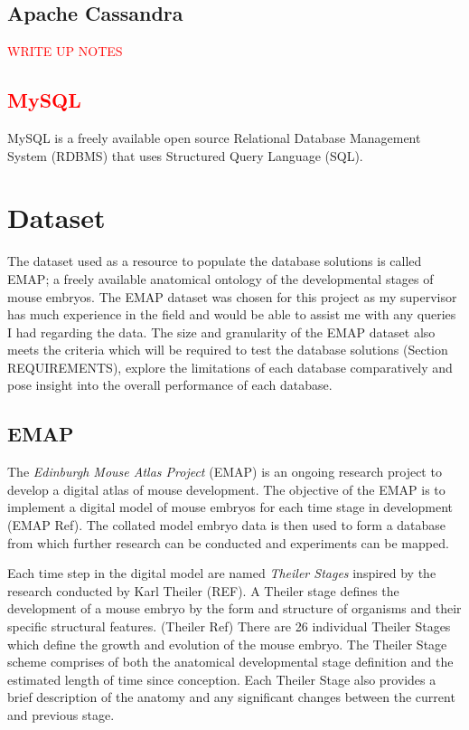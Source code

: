 \subsection{Apache Cassandra}\label{cassandra}
\textcolor{red}{WRITE UP NOTES}

\textcolor{red}{\subsection{MySQL}\label{mysql}}
MySQL is a freely available open source Relational Database Management System (RDBMS) that uses Structured Query Language (SQL).

\section{Dataset}
The dataset used as a resource to populate the database solutions is called EMAP; a freely available anatomical ontology of the developmental stages of mouse embryos. The EMAP dataset was chosen for this project as my supervisor has much experience in the field and would be able to assist me with any queries I had regarding the data. The size and granularity of the EMAP dataset also meets the criteria which will be required to test the database solutions (Section REQUIREMENTS), explore the limitations of each database comparatively and pose insight into the overall performance of each database.

\subsection{EMAP}
The \textit{Edinburgh Mouse Atlas Project} (EMAP) is an ongoing research project to develop a digital atlas of mouse development. The objective of the EMAP is to implement a digital model of mouse embryos for each time stage in development (EMAP Ref). The collated model embryo data is then used to form a database from which further research can be conducted and experiments can be mapped.
 
Each time step in the digital model are named \textit{Theiler Stages} inspired by the research conducted by Karl Theiler (REF). A Theiler stage defines the development of a mouse embryo by the form and structure of organisms and their specific structural features. (Theiler Ref) There are 26 individual Theiler Stages which define the growth and evolution of the mouse embryo. The Theiler Stage scheme comprises of both the anatomical developmental stage definition and the estimated length of time since conception. Each Theiler Stage also provides a brief description of the anatomy and any significant changes between the current and previous stage.

